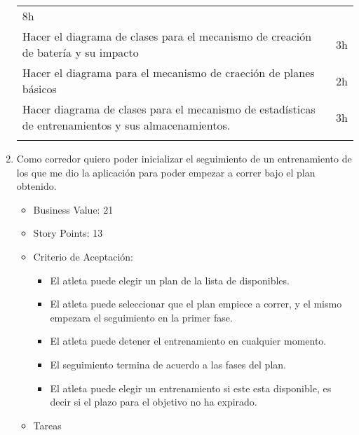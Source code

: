 \begin{enumerate}
\begin{longtable}[c]{@{}ll@{}}
\begin{minipage}[t]{0.08\columnwidth}
  8h
  \end{minipage}
  \\\noalign{\medskip}
  \begin{minipage}[t]{0.92\columnwidth}\raggedright
  Hacer el diagrama de clases para el mecanismo de creación de batería y
  su impacto
  \end{minipage} & \begin{minipage}[t]{0.08\columnwidth}\raggedright
  3h
  \end{minipage}
  \\\noalign{\medskip}
  \begin{minipage}[t]{0.92\columnwidth}\raggedright
  Hacer el diagrama para el mecanismo de craeción de planes básicos
  \end{minipage} & \begin{minipage}[t]{0.08\columnwidth}\raggedright
  2h
  \end{minipage}
  \\\noalign{\medskip}
  \begin{minipage}[t]{0.92\columnwidth}\raggedright
  Hacer diagrama de clases para el mecanismo de estadísticas de
  entrenamientos y sus almacenamientos.
  \end{minipage} & \begin{minipage}[t]{0.08\columnwidth}\raggedright
  3h
  \end{minipage}
  \\\noalign{\medskip}
  \hline
  \end{longtable}
\item
  Como corredor quiero poder inicializar el seguimiento de un
  entrenamiento de los que me dio la aplicación para poder empezar a
  correr bajo el plan obtenido.

  \begin{itemize}
  \itemsep1pt\parskip0pt
  \item
    Business Value: 21
  \item
    Story Points: 13
  \item
    Criterio de Aceptación:

    \begin{itemize}
    \itemsep1pt\parskip0pt
    \item
      El atleta puede elegir un plan de la lista de disponibles.
    \item
      El atleta puede seleccionar que el plan empiece a correr, y el
      mismo empezara el seguimiento en la primer fase.
    \item
      El atleta puede detener el entrenamiento en cualquier momento.
    \item
      El seguimiento termina de acuerdo a las fases del plan.
    \item
      El atleta puede elegir un entrenamiento si este esta disponible,
      es decir si el plazo para el objetivo no ha expirado.
    \end{itemize}
  \item
    Tareas
  \end{itemize}


\end{enumerate}
